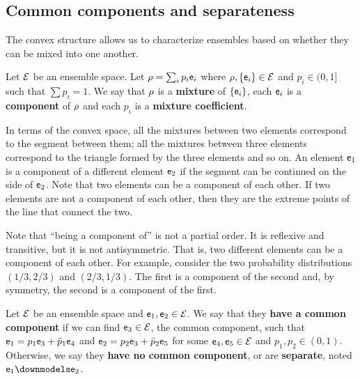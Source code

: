 \subsection{Common components and separateness}

The convex structure allows us to characterize ensembles based on whether they can be mixed into one another.

\begin{defn}
	Let $\Ens$ be an ensemble space. Let $\ens[\rho] = \sum_i p_i \ens_i$ where $\ens[\rho], \{\ens_i\} \in \Ens$ and $p_i \in (0,1]$ such that $\sum p_i = 1$. We say that $\ens[\rho]$ is a \textbf{mixture} of $\{\ens_i\}$, each $\ens_i$ is a \textbf{component} of $\ens[\rho]$ and each $p_i$ is a \textbf{mixture coefficient}.
\end{defn}

\begin{remark}
	In terms of the convex space, all the mixtures between two elements correspond to the segment between them; all the mixtures between three elements correspond to the triangle formed by the three elements and so on. An element $\ens_1$ is a component of a different element $\ens_2$ if the segment can be continued on the side of $\ens_2$. Note that two elements can be a component of each other. If two elements are not a component of each other, then they are the extreme points of the line that connect the two.
\end{remark}

\begin{remark}
	Note that ``being a component of'' is not a partial order. It is reflexive and transitive, but it is not antisymmetric. That is, two different elements can be a component of each other. For example, consider the two probability distributions $(1/3, 2/3)$ and $(2/3, 1/3)$. The first is a component of the second and, by symmetry, the second is a component of the first.
\end{remark}


\begin{defn}
	Let $\Ens$ be an ensemble space and $\ens_1, \ens_2 \in \Ens$. We say that they \textbf{have a common component} if we can find $\ens_3 \in \Ens$, the common component, such that $\ens_1 = p_1 \ens_3 + \bar{p}_1 \ens_4$ and $\ens_2 = p_2 \ens_3 + \bar{p}_2 \ens_5$ for some $\ens_4, \ens_5 \in \Ens$ and $p_1, p_2 \in (0,1)$. Otherwise, we say they \textbf{have no common component}, or are \textbf{separate}, noted $\ens_1 \separate \ens_2$.
\end{defn}

